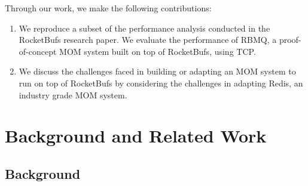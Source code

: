 \documentclass[letterpaper,twocolumn,10pt]{article}
\begin{document}
Through our work, we make the following contributions:
\begin{enumerate}
\item We reproduce a subset of the performance analysis conducted in the RocketBufs research paper. We evaluate the performance of RBMQ, a proof-of-concept MOM system built on top of RocketBufs, using TCP.

\item We discuss the challenges faced in building or adapting an MOM system to run on top of RocketBufs by considering the challenges in adapting Redis, an industry grade MOM system.
\end{enumerate}



\section{Background and Related Work}

\subsection{Background}
\end{document}
